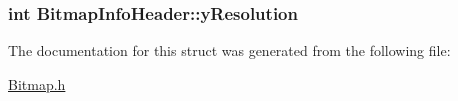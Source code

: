 \subsubsection[{\texorpdfstring{y\+Resolution}{yResolution}}]{\setlength{\rightskip}{0pt plus 5cm}int Bitmap\+Info\+Header\+::y\+Resolution}\hypertarget{structBitmapInfoHeader_af2fadf9c216cc9f3ce401096e35be1b7}{}\label{structBitmapInfoHeader_af2fadf9c216cc9f3ce401096e35be1b7}


The documentation for this struct was generated from the following file\+:\begin{DoxyCompactItemize}
\item 
\hyperlink{Bitmap_8h}{Bitmap.\+h}\end{DoxyCompactItemize}
